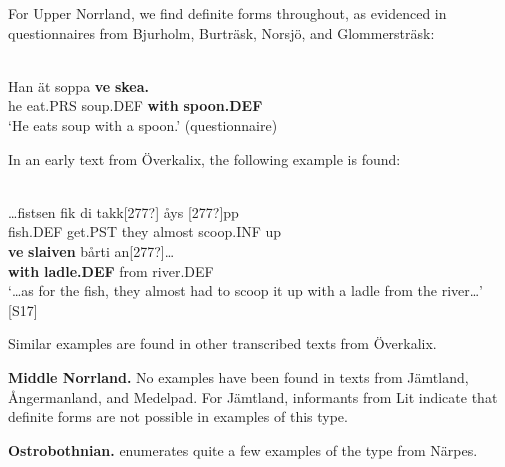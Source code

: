 \z

For Upper Norrland, we find definite forms throughout, as evidenced in questionnaires from Bjurholm, Burträsk, Norsjö, and Glommersträsk:


\ea \label{} 
\\
\gll Han  ät  soppa  \textbf{ve} \textbf{skea.} \\
he  eat.PRS  soup.DEF  \textbf{with} \textbf{spoon.DEF} \\
\glt ‘He eats soup with a spoon.’ (questionnaire)

\z

In an early text from Överkalix, the following example is found:


\ea \label{} 
\\
\gll …fistsen  fik  di  takk[277?]  åys  [277?]pp\\
fish.DEF  get.PST  they  almost  scoop.INF  up\\
\gll \textbf{ve} \textbf{slaiven} bårti  an[277?]…\\
\textbf{with} \textbf{ladle.DEF} from  river.DEF\\
\glt ‘…as for the fish, they almost had to scoop it up with a ladle from the river…’ [S17]

\z

Similar examples are found in other transcribed texts from Överkalix. 


\textbf{Middle Norrland.} No examples have been found in texts from Jämtland, Ångermanland, and Medelpad. For Jämtland, informants from Lit indicate that definite forms are not possible in examples of this type.


\textbf{Ostrobothnian. }\citet{Hummelstedt1934} enumerates quite a few examples of the type from Närpes. 

